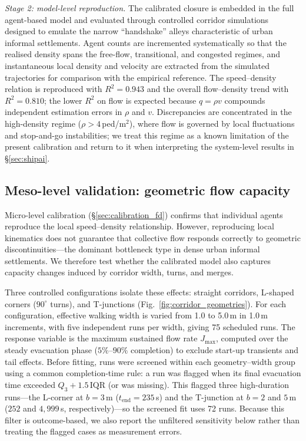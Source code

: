 \documentclass[preprint,12pt]{elsarticle}
\providecommand{\FloatBarrier}{}
\let\origsubsection\subsection
\renewcommand{\subsection}{\FloatBarrier\origsubsection}
\begin{document}
\emph{Stage 2: model-level reproduction.} The calibrated closure is
embedded in the full agent-based model and evaluated through controlled
corridor simulations designed to emulate the narrow ``handshake''
alleys characteristic of urban informal settlements. Agent counts are
incremented systematically so that the realised density spans the
free-flow, transitional, and congested regimes, and instantaneous
local density and velocity are extracted from the simulated
trajectories for comparison with the empirical reference. The
speed--density relation is reproduced with $R^{2} = 0.943$ and the
overall flow--density trend with $R^{2} = 0.810$; the lower $R^{2}$ on
flow is expected because $q = \rho v$ compounds independent estimation
errors in $\rho$ and $v$. Discrepancies are concentrated in the
high-density regime ($\rho > 4$\,ped/m$^{2}$), where flow is governed
by local fluctuations and stop-and-go instabilities; we treat this
regime as a known limitation of the present calibration and return to
it when interpreting the system-level results in
\S\ref{sec:shipai}.


\subsection{Meso-level validation: geometric flow capacity}
\label{sec:validation_flow_width}

Micro-level calibration (\S\ref{sec:calibration_fd}) confirms that
individual agents reproduce the local speed--density relationship.
However, reproducing local kinematics does not guarantee that collective
flow responds correctly to geometric discontinuities---the dominant
bottleneck type in dense urban informal settlements. We therefore test
whether the calibrated model also captures capacity changes induced by
corridor width, turns, and merges.

Three controlled configurations isolate these effects:
straight corridors, L-shaped corners ($90^\circ$ turns), and T-junctions
(Fig.~\ref{fig:corridor_geometries}). For each configuration, effective
walking width is varied from 1.0 to 5.0\,m in 1.0\,m increments, with
five independent runs per width, giving 75 scheduled runs. The response
variable is the maximum sustained flow rate $J_{\max}$, computed over
the steady evacuation phase ($5\%$--$90\%$ completion) to exclude
start-up transients and tail effects. Before fitting, runs were screened
within each geometry--width group using a common completion-time rule:
a run was flagged when its final evacuation time exceeded
$Q_3+1.5\,\mathrm{IQR}$ (or was missing). This flagged three high-duration
runs---the L-corner at $b=3$\,m ($t_{\mathrm{end}}=235$\,s) and the
T-junction at $b=2$ and $5$\,m ($252$ and $4{,}999$\,s, respectively)---so
the screened fit uses 72 runs. Because this filter is outcome-based, we
also report the unfiltered sensitivity below rather than treating the
flagged cases as measurement errors.
\end{document}
